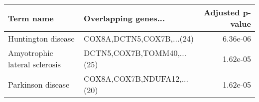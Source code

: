 \begin{tabular}{llr}
\toprule
                    Term name &        Overlapping genes... &  Adjusted p-value \\
\midrule
           Huntington disease &   COX8A,DCTN5,COX7B,...(24) &          6.36e-06 \\
Amyotrophic lateral sclerosis &  DCTN5,COX7B,TOMM40,...(25) &          1.62e-05 \\
            Parkinson disease & COX8A,COX7B,NDUFA12,...(20) &          1.62e-05 \\
\bottomrule
\end{tabular}
